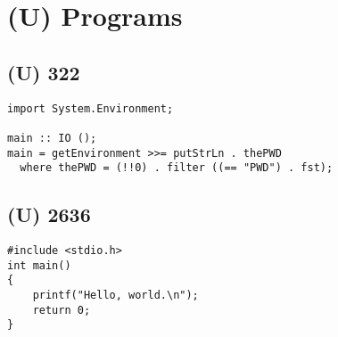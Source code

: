 \documentclass{article}
\begin{document}
	\section{(U) Programs}
		\subsection{(U) 322}\label{subsection:p322}
			\begin{lstlisting}
import System.Environment;

main :: IO ();
main = getEnvironment >>= putStrLn . thePWD
  where thePWD = (!!0) . filter ((== "PWD") . fst);
			\end{lstlisting}
		\subsection{(U) 2636}\label{subsection:p2636}
			\begin{lstlisting}
#include <stdio.h>
int main()
{
	printf("Hello, world.\n");
	return 0;
}
			\end{lstlisting}
\end{document}
